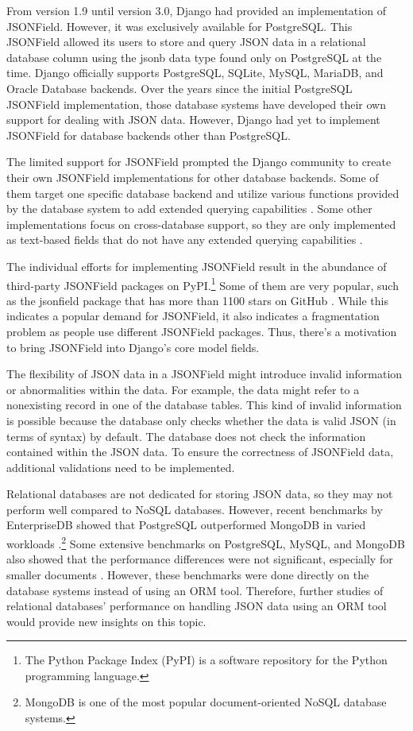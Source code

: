 From version 1.9 until version 3.0, Django had provided an implementation of
JSONField. However, it was exclusively available for PostgreSQL. This JSONField
allowed its users to store and query JSON data in a relational database column
using the jsonb data type found only on PostgreSQL at the time. Django
officially supports PostgreSQL, SQLite, MySQL, MariaDB, and Oracle Database
backends. Over the years since the initial PostgreSQL JSONField implementation,
those database systems have developed their own support for dealing with JSON
data. However, Django had yet to implement JSONField for database backends
other than PostgreSQL.

The limited support for JSONField prompted the Django community to create their
own JSONField implementations for other database backends. Some of them target
one specific database backend and utilize various functions provided by the
database system to add extended querying capabilities \cite{mysql_jsonfield}
\cite{oracle_jsonfield}. Some other implementations focus on cross-database
support, so they are only implemented as text-based fields that do not have any
extended querying capabilities \cite{ryan_jsonfield}.

The individual efforts for implementing JSONField result in the abundance of
third-party JSONField packages on PyPI.\footnote{The Python Package Index
(PyPI) is a software repository for the Python programming language.} Some
of them are very popular, such as the jsonfield package that has more than 1100
stars on GitHub \cite{ryan_jsonfield}. While this indicates a popular demand
for JSONField, it also indicates a fragmentation problem as people use
different JSONField packages. Thus, there's a motivation to bring JSONField
into Django's core model fields.

The flexibility of JSON data in a JSONField might introduce invalid information
or abnormalities within the data. For example, the data might refer to a
nonexisting record in one of the database tables. This kind of invalid
information is possible because the database only checks whether the data is
valid JSON (in terms of syntax) by default. The database does not check the
information contained within the JSON data. To ensure the correctness of
JSONField data, additional validations need to be implemented.

Relational databases are not dedicated for storing JSON data, so they may not
perform well compared to NoSQL databases. However, recent benchmarks by
EnterpriseDB showed that PostgreSQL outperformed MongoDB in varied workloads
\cite{enterprisedb_benchmark}.\footnote{MongoDB is one of the most popular
document-oriented NoSQL database systems.} Some extensive benchmarks on
PostgreSQL, MySQL, and MongoDB also showed that the performance differences
were not significant, especially for smaller documents \cite{dolgov_benchmark}.
However, these benchmarks were done directly on the database systems instead
of using an ORM tool. Therefore, further studies of relational databases'
performance on handling JSON data using an ORM tool would provide new insights
on this topic.


